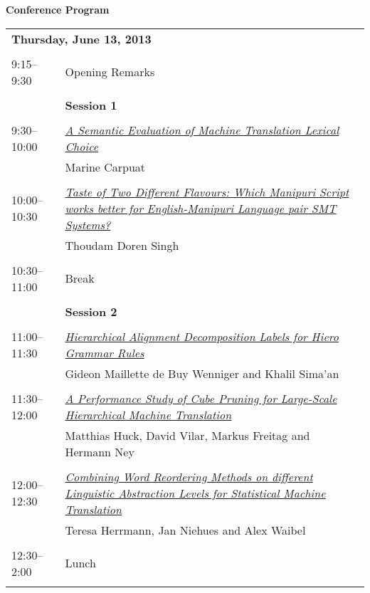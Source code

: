 \setlength{\parindent}{0in}
\setlength{\parskip}{2ex}
\renewcommand{\baselinestretch}{0.87}

\begin{center}
{\Large \bf
  Conference Program
}
\end{center}
\vspace{3mm}
\begin{tabular}{p{20mm}p{128mm}}
\multicolumn{2}{l}{\bf Thursday, June 13, 2013} \\
\\
9:15--9:30 & Opening Remarks \\
\\
 & {\bf Session 1} \\
\\
9:30--10:00 & \hyperlink{page.1}{\em A Semantic Evaluation of Machine Translation Lexical Choice}\\
         & Marine Carpuat \\
\\

10:00--10:30 & \hyperlink{page.11}{\em Taste of Two Different Flavours: Which Manipuri Script works better for English-Manipuri Language pair SMT Systems?}\\
         & Thoudam Doren Singh \\
\\

10:30--11:00 & Break \\
\\
 & {\bf Session 2} \\
\\
11:00--11:30 & \hyperlink{page.19}{\em Hierarchical Alignment Decomposition Labels for Hiero Grammar Rules}\\
         & Gideon Maillette de Buy Wenniger and Khalil Sima'an \\
\\

11:30--12:00 & \hyperlink{page.29}{\em A Performance Study of Cube Pruning for Large-Scale Hierarchical Machine Translation}\\
         & Matthias Huck, David Vilar, Markus Freitag and Hermann Ney \\
\\

12:00--12:30 & \hyperlink{page.39}{\em Combining Word Reordering Methods on different Linguistic Abstraction Levels for Statistical Machine Translation}\\
         & Teresa Herrmann, Jan Niehues and Alex Waibel \\
\\

12:30--2:00 & Lunch \\
\\
\end{tabular}
